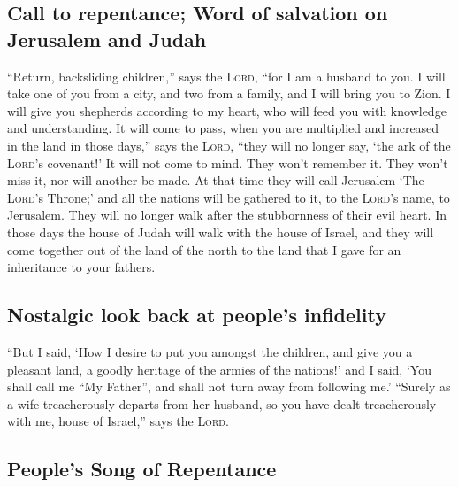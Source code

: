 \hypertarget{call-to-repentance-word-of-salvation-on-jerusalem-and-judah}{%
\subsection{Call to repentance; Word of salvation on Jerusalem and
Judah}\label{call-to-repentance-word-of-salvation-on-jerusalem-and-judah}}

 ``Return, backsliding children,'' says the
\textsc{Lord}, ``for I am a husband to you. I will take one of you from
a city, and two from a family, and I will bring you to Zion.
 I will give you shepherds according to my heart, who
will feed you with knowledge and understanding.  It will
come to pass, when you are multiplied and increased in the land in those
days,'' says the \textsc{Lord}, ``they will no longer say, `the ark of
the \textsc{Lord}'s covenant!' It will not come to mind. They won't
remember it. They won't miss it, nor will another be made.
 At that time they will call Jerusalem `The
\textsc{Lord}'s Throne;' and all the nations will be gathered to it, to
the \textsc{Lord}'s name, to Jerusalem. They will no longer walk after
the stubbornness of their evil heart.  In those days the
house of Judah will walk with the house of Israel, and they will come
together out of the land of the north to the land that I gave for an
inheritance to your fathers.

\hypertarget{nostalgic-look-back-at-peoples-infidelity}{%
\subsection{Nostalgic look back at people's
infidelity}\label{nostalgic-look-back-at-peoples-infidelity}}

 ``But I said, `How I desire to put you amongst the
children, and give you a pleasant land, a goodly heritage of the armies
of the nations!' and I said, `You shall call me ``My Father'', and shall
not turn away from following me.'  ``Surely as a wife
treacherously departs from her husband, so you have dealt treacherously
with me, house of Israel,'' says the \textsc{Lord}.

\hypertarget{peoples-song-of-repentance}{%
\subsection{People's Song of
Repentance}\label{peoples-song-of-repentance}}

